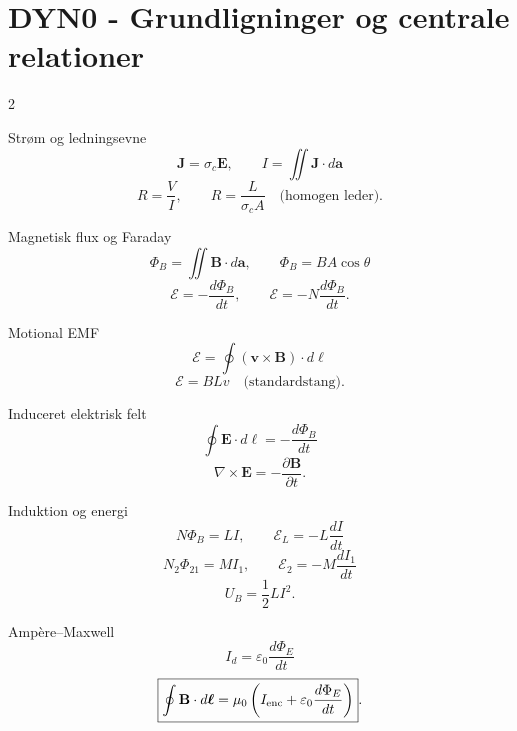 \documentclass[10pt,a4paper]{article}
\begin{document}
\newpage
\section*{DYN0 - Grundligninger og centrale relationer}
{}
\begin{multicols}{2}
\begin{quickbox}{Strøm og ledningsevne}
\[
\boxed{\mathbf J=\sigma_c\mathbf E},
\qquad
\boxed{I=\iint\mathbf J\cdot d\mathbf a}
\]
\[
\boxed{R=\frac VI},
\qquad
\boxed{R=\frac{L}{\sigma_cA}}\quad\text{(homogen leder).}
\]
\end{quickbox}
\begin{quickbox}{Magnetisk flux og Faraday}
\[
\boxed{\Phi_B=\iint\mathbf B\cdot d\mathbf a},
\qquad
\Phi_B=BA\cos\theta
\]
\[
\boxed{\mathcal E=-\frac{d\Phi_B}{dt}},
\qquad
\boxed{\mathcal E=-N\frac{d\Phi_B}{dt}}.
\]
\end{quickbox}
\begin{quickbox}{Motional EMF}
\[
\boxed{\mathcal E=\oint(\mathbf v\times\mathbf B)\cdot d\boldsymbol\ell}
\]
\[
\boxed{\mathcal E=BLv}\quad\text{(standardstang).}
\]
\end{quickbox}
\begin{quickbox}{Induceret elektrisk felt}
\[
\boxed{\oint\mathbf E\cdot d\boldsymbol\ell=-\frac{d\Phi_B}{dt}}
\]
\[
\boxed{\nabla\times\mathbf E=-\frac{\partial\mathbf B}{\partial t}}.
\]
\end{quickbox}
\begin{quickbox}{Induktion og energi}
\[
\boxed{N\Phi_B=LI},
\qquad
\boxed{\mathcal E_L=-L\frac{dI}{dt}}
\]
\[
\boxed{N_2\Phi_{21}=MI_1},
\qquad
\boxed{\mathcal E_2=-M\frac{dI_1}{dt}}
\]
\[
\boxed{U_B=\frac12LI^2}.
\]
\end{quickbox}
\begin{quickbox}{Ampère--Maxwell}
\[
\boxed{I_d=\varepsilon_0\frac{d\Phi_E}{dt}}
\]
\[
\boxed{\oint\mathbf B\cdot d\boldsymbol\ell=
\mu_0\left(I_{\rm enc}+\varepsilon_0\frac{d\Phi_E}{dt}\right)}.
\]
\end{quickbox}
\end{multicols}
\end{document}
